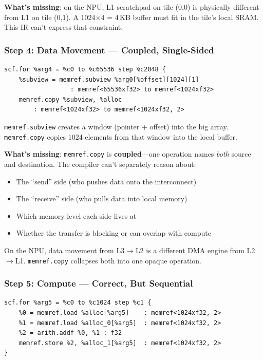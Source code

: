 \documentclass[11pt,a4paper]{article}
\begin{document}
\textbf{What's missing}: on the NPU, L1 scratchpad on tile (0,0) is physically
different from L1 on tile (0,1). A 1024$\times$4 = 4\,KB buffer must fit in the
tile's local SRAM. This IR can't express that constraint.

\subsubsection{Step 4: Data Movement --- Coupled, Single-Sided}
\begin{lstlisting}
scf.for %arg4 = %c0 to %c65536 step %c2048 {
    %subview = memref.subview %arg0[%offset][1024][1]
                  : memref<65536xf32> to memref<1024xf32>
    memref.copy %subview, %alloc
        : memref<1024xf32> to memref<1024xf32, 2>
\end{lstlisting}

\texttt{memref.subview} creates a window (pointer + offset) into the big array.
\texttt{memref.copy} copies 1024 elements from that window into the local buffer.

\textbf{What's missing}: \texttt{memref.copy} is \textbf{coupled}---one operation
names \emph{both} source and destination. The compiler can't separately reason about:
\begin{itemize}[leftmargin=2em]
  \item The ``send'' side (who pushes data onto the interconnect)
  \item The ``receive'' side (who pulls data into local memory)
  \item Which memory level each side lives at
  \item Whether the transfer is blocking or can overlap with compute
\end{itemize}

On the NPU, data movement from L3$\rightarrow$L2 is a different DMA engine from
L2$\rightarrow$L1. \texttt{memref.copy} collapses both into one opaque operation.

\subsubsection{Step 5: Compute --- Correct, But Sequential}
\begin{lstlisting}
scf.for %arg5 = %c0 to %c1024 step %c1 {
    %0 = memref.load %alloc[%arg5]    : memref<1024xf32, 2>
    %1 = memref.load %alloc_0[%arg5]  : memref<1024xf32, 2>
    %2 = arith.addf %0, %1 : f32
    memref.store %2, %alloc_1[%arg5]  : memref<1024xf32, 2>
}
\end{lstlisting}
\end{document}
